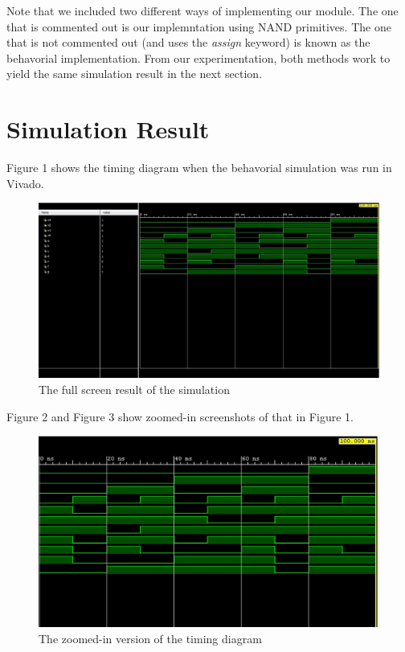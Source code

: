 \documentclass{article}
\begin{document}
Note that we included two different ways of implementing our module. The one 
that is commented out is our implemntation using NAND primitives. The one that 
is not commented out (and uses the \textit{assign} keyword) is known as the 
behavorial implementation. From our experimentation, both methods work to 
yield the same simulation result in the next section.


\section{Simulation Result}
Figure 1 shows the timing diagram when the behavorial simulation was run in 
Vivado.\\
\clearpage

\begin{figure}[h!]
\centering
\includegraphics[scale=0.4]{Timing_Diagram}
\caption{The full screen result of the simulation}
\end{figure}

Figure 2 and Figure 3 show zoomed-in screenshots of that in Figure 1.\\

\begin{figure}[h!]
\centering
\includegraphics[scale=0.4]{Timing_Diagram-Magnified_Voltages}
\caption{The zoomed-in version of the timing diagram}
\end{figure}
\end{document}
